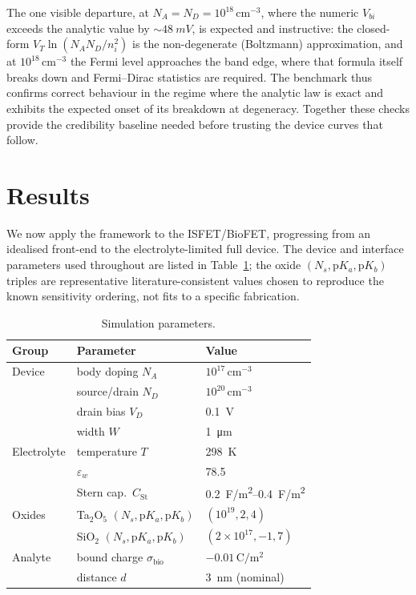 \documentclass[10pt,journal]{IEEEtran}
\newcommand{\ee}[1]{\times 10^{#1}}
\begin{document}
The one visible departure, at $N_A=N_D=10^{18}\,\mathrm{cm^{-3}}$, where the
numeric $V_{bi}$ exceeds the analytic value by $\sim\!\SI{48}{mV}$, is expected
and instructive: the closed-form $V_T\ln(N_AN_D/n_i^2)$ is the non-degenerate
(Boltzmann) approximation, and at $10^{18}\,\mathrm{cm^{-3}}$ the Fermi level
approaches the band edge, where that formula itself breaks down and Fermi--Dirac
statistics are required. The benchmark thus confirms correct behaviour in the
regime where the analytic law is exact and exhibits the expected onset of its
breakdown at degeneracy. Together these checks provide the credibility baseline
needed before trusting the device curves that follow.

\section{Results}
\label{sec:results}

We now apply the framework to the ISFET/BioFET, progressing from an idealised
front-end to the electrolyte-limited full device. The device and interface
parameters used throughout are listed in Table~\ref{tab:params}; the oxide
$(N_s,\mathrm{p}K_a,\mathrm{p}K_b)$ triples are representative literature-consistent
values chosen to reproduce the known sensitivity ordering, not fits to a specific
fabrication.

\begin{table}[t]
\centering
\caption{Simulation parameters.}
\label{tab:params}
\footnotesize
\begin{tabular}{@{}lll@{}}
\toprule
Group & Parameter & Value \\
\midrule
Device & body doping $N_A$ & $10^{17}\,\mathrm{cm^{-3}}$ \\
       & source/drain $N_D$ & $10^{20}\,\mathrm{cm^{-3}}$ \\
       & drain bias $V_D$ & \SI{0.1}{V} \\
       & width $W$ & \SI{1}{\micro m} \\
Electrolyte & temperature $T$ & \SI{298}{K} \\
       & $\varepsilon_w$ & 78.5 \\
       & Stern cap.\ $C_{\mathrm{St}}$ & \SIrange{0.2}{0.4}{F/m^2} \\
Oxides & Ta$_2$O$_5$ $(N_s,\mathrm{p}K_a,\mathrm{p}K_b)$ & $(10^{19},2,4)$ \\
       & SiO$_2$ $(N_s,\mathrm{p}K_a,\mathrm{p}K_b)$ & $(2\ee{17},-1,7)$ \\
Analyte & bound charge $\sigma_{\mathrm{bio}}$ & $-0.01\,\mathrm{C/m^2}$ \\
       & distance $d$ & \SI{3}{nm} (nominal) \\
\bottomrule
\end{tabular}
\end{table}
\end{document}
